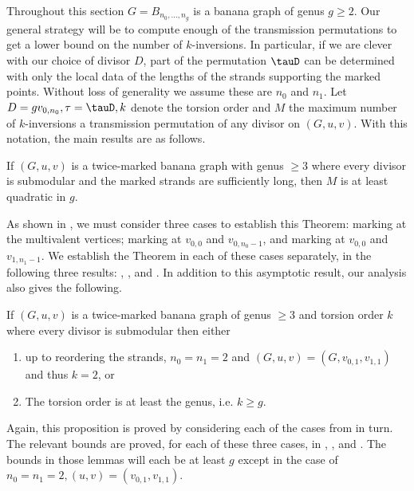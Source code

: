 Throughout this section $G = B_{n_0,\dots,n_g}$ is a banana graph of genus $g\geq 2$. Our general strategy will be to compute enough of the transmission permutations to get a lower bound on the number of $k$-inversions. In particular, if we are clever with our choice of divisor $D$, part of the permutation $\tauD$ can be determined with only the local data of the lengths of the strands supporting the marked points. Without loss of generality we assume these are $n_0$ and $n_1$. Let $D = gv_{0,n_0}, \tau = \tauD, k$ denote the torsion order and $M$ the maximum number of $k$-inversions a transmission permutation of any divisor on $(G,u,v)$. With this notation, the main results are as follows.

\begin{theorem}\label{thm-quadInvGrowth}
    If $(G,u,v)$ is a twice-marked banana graph with genus $\geq 3$ where every divisor is submodular and the marked strands are sufficiently long, then $M$ is at least quadratic in $g$.
\end{theorem}

As shown in , we must consider three cases to establish this Theorem: marking at the multivalent vertices; marking at $v_{0,0}$ and $v_{0,n_0-1}$, and marking at $v_{0,0}$ and $v_{1,n_1-1}$. We establish the Theorem in each of these cases separately, in the following three results: , , and . In addition to this asymptotic result, our analysis also gives the following. 


\begin{prop}\label{prop-bananTorsion}
    If $(G,u,v)$ is a twice-marked banana graph of genus $\geq 3$ and torsion order $k$ where every divisor is submodular then either
    \begin{enumerate}[label = \arabic*)]
        \item up to reordering the strands, $n_0 = n_1 = 2$ and $(G,u,v) = (G,v_{0,1},v_{1,1})$ and thus $k = 2$, or
        \item The torsion order is at least the genus, i.e. $k \geq g$.
    \end{enumerate}
\end{prop}

Again, this proposition is proved by considering each of the cases from  in turn. The relevant bounds are proved, for each of these three cases, in , , and . The bounds in those lemmas will each be at least $g$ except in the case of $n_0 = n_1 = 2, (u,v) = (v_{0,1},v_{1,1})$.

